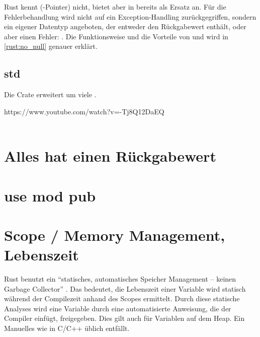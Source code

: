 Rust kennt (-Pointer) nicht, bietet aber in  bereits  als Ersatz an.
Für die Fehlerbehandlung wird nicht auf ein Exception-Handling zurückgegriffen, sondern ein eigener Datentyp angeboten, der entweder den Rückgabewert enthält, oder aber einen Fehler: .
Die Funktionsweise und die Vorteile von  und  wird in \autoref{rust:no_null} genauer erklärt.

\subsection{std}
\label{rust:std}

Die Crate  erweitert  um viele .      




https://www.youtube.com/watch?v=-Tj8Q12DaEQ \\
 \\



\section{Alles hat einen Rückgabewert}

\section{use mod pub}


\section{Scope / Memory Management, Lebenszeit}
\label{rust:scope}
\label{rust:static_analysis}

Rust benutzt ein \enquote{statisches, automatisches Speicher Management -- keinen Garbage Collector} \cite{rust:youtube:goto2017}.
Das bedeutet, die Lebenszeit einer Variable wird statisch während der Compilezeit anhand des Scopes  ermittelt.
Durch diese statische Analyses wird eine Variable durch eine automatisierte Anweisung, die der Compiler einfügt, freigegeben.
Dies gilt auch für Variablen auf dem Heap.
Ein Manuelles  wie in C/C++ üblich entfällt.


